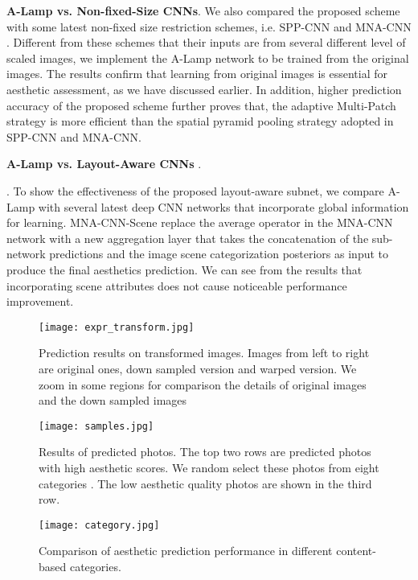 \documentclass[10pt,twocolumn,letterpaper]{article}
\begin{document}
	\textbf{A-Lamp vs. Non-fixed-Size CNNs}.
	We also compared the proposed scheme with some latest non-fixed size restriction schemes, i.e. SPP-CNN \cite{He:archive:2014} and MNA-CNN \cite{Mai:2016:CVPR}. Different from these schemes that their inputs are from several different level of scaled images, we implement the A-Lamp network to be trained from the original images. The results confirm that learning from original images is essential for aesthetic assessment, as we have discussed earlier. In addition, higher prediction accuracy of the proposed scheme further proves that, the adaptive Multi-Patch strategy is more efficient than the spatial pyramid pooling strategy adopted in SPP-CNN and MNA-CNN.
	
	\textbf{A-Lamp vs. Layout-Aware CNNs }.
	
	. To show the effectiveness of the proposed layout-aware subnet, we compare A-Lamp with several latest deep CNN networks that incorporate global information for learning. MNA-CNN-Scene \cite{Mai:2016:CVPR} replace the average operator in the MNA-CNN network with a new aggregation layer that takes the concatenation of the sub-network predictions and the image scene categorization posteriors as input to produce the final aesthetics prediction. We can see from the results that incorporating scene attributes does not cause noticeable performance improvement.
	
	\begin{figure}
		\centering
		\texttt{[image: expr\_transform.jpg]}
		\caption{Prediction results on transformed images. Images from left to right are original ones, down sampled version and warped version. We zoom in some regions for comparison the details of original images and the down sampled images }
		\label{trans_img}	
		\vspace{-3mm}
	\end{figure}
	
	
	\begin{figure*}
		\centering
		\texttt{[image: samples.jpg]}
		\caption{Results of predicted photos. The top two rows are predicted photos with high aesthetic scores. We random select these photos from eight categories \cite{Murray:MMP2012:AVA}. The low aesthetic quality photos are shown in the third row.}
		\label{samples}
		\vspace{-1mm}
	\end{figure*}
	
	\begin{figure} [!t]
		\centering
		\texttt{[image: category.jpg]}
		\caption{Comparison of aesthetic prediction performance in different content-based categories.}
		\label{category}
		\vspace{-5mm}
	\end{figure}
	
\end{document}
